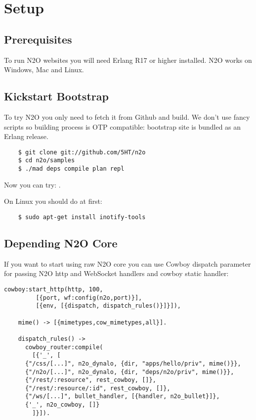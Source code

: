 \section{Setup}

\subsection{Prerequisites}
To run N2O websites you will need Erlang R17 or higher installed.
N2O works on Windows, Mac and Linux.

\subsection{Kickstart Bootstrap}
To try N2O you only need to fetch it from Github and build. We don't use
fancy scripts so building process is OTP compatible: bootstrap site
is bundled as an Erlang release.

\vspace{1\baselineskip}
\begin{lstlisting}
    $ git clone git://github.com/5HT/n2o
    $ cd n2o/samples
    $ ./mad deps compile plan repl
\end{lstlisting}
\vspace{1\baselineskip}

Now you can try: .

On Linux you should do at first:

\begin{lstlisting}
    $ sudo apt-get install inotify-tools
\end{lstlisting}

\newpage
\subsection{Depending N2O Core}
If you want to start using raw N2O core you can use Cowboy dispatch parameter
for passing N2O http and WebSocket handlers and cowboy static handler:

\begin{lstlisting}[caption=web\_sup.erl]
    cowboy:start_http(http, 100, 
         [{port, wf:config(n2o,port)}],
         [{env, [{dispatch, dispatch_rules()}]}]),

    mime() -> [{mimetypes,cow_mimetypes,all}].

    dispatch_rules() ->
      cowboy_router:compile(
        [{'_', [
      {"/css/[...]", n2o_dynalo, {dir, "apps/hello/priv", mime()}},
      {"/n2o/[...]", n2o_dynalo, {dir, "deps/n2o/priv", mime()}},
      {"/rest/:resource", rest_cowboy, []},
      {"/rest/:resource/:id", rest_cowboy, []},
      {"/ws/[...]", bullet_handler, [{handler, n2o_bullet}]},
      {'_', n2o_cowboy, []}
        ]}]).
\end{lstlisting}
\vspace{1\baselineskip}

